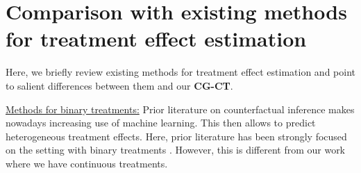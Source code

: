 \documentclass[sigconf]{acmart}
\newcommand{\framework}{\textbf{\mbox{CG-CT}}\xspace}
\begin{document}
\section{Comparison with existing methods for treatment effect estimation} 
\label{supp:lit_methods} %

Here, we briefly review existing methods for treatment effect estimation and point to salient differences between them and our \framework. 

\vspace{0.25cm}
\noindent
\underline{Methods for binary treatments:} Prior literature on counterfactual inference makes nowadays increasing use of machine learning. This then allows to predict heterogeneous treatment effects. Here, prior literature has been strongly focused on the setting with binary treatments \cite{Johansson2016, Shalit2017, Yoon2018, Athey2019, Hatt2021}. However, this is different from our work where we have continuous treatments.  
\end{document}
